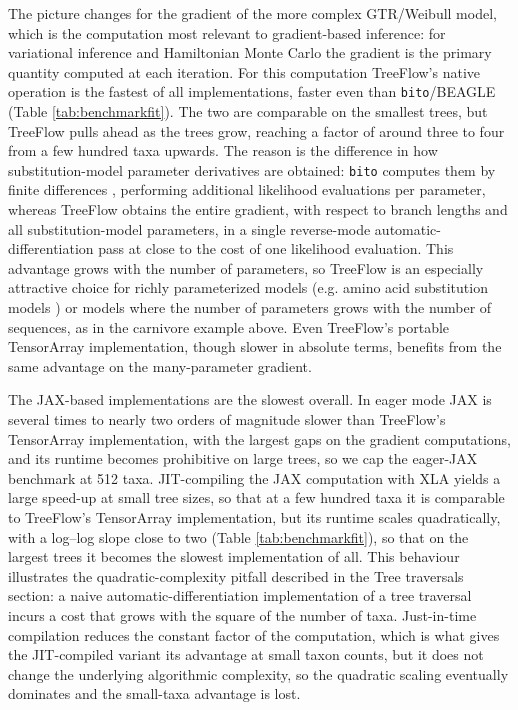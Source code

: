 The picture changes for the gradient of the more complex GTR/Weibull model, which is the computation most relevant to gradient-based inference: for variational inference and Hamiltonian Monte Carlo the gradient is the primary quantity computed at each iteration. For this computation TreeFlow's native operation is the fastest of all implementations, faster even than \texttt{bito}/BEAGLE (Table \ref{tab:benchmarkfit}). The two are comparable on the smallest trees, but TreeFlow pulls ahead as the trees grow, reaching a factor of around three to four from a few hundred taxa upwards. The reason is the difference in how substitution-model parameter derivatives are obtained: \texttt{bito} computes them by finite differences \cite{fourment2023automatic}, performing additional likelihood evaluations per parameter, whereas TreeFlow obtains the entire gradient, with respect to branch lengths and all substitution-model parameters, in a single reverse-mode automatic-differentiation pass at close to the cost of one likelihood evaluation. This advantage grows with the number of parameters, so TreeFlow is an especially attractive choice for richly parameterized models (e.g. amino acid substitution models \cite{adachi1996model}) or models where the number of parameters grows with the number of sequences, as in the carnivore example above. Even TreeFlow's portable TensorArray implementation, though slower in absolute terms, benefits from the same advantage on the many-parameter gradient.

The JAX-based implementations are the slowest overall. In eager mode JAX is several times to nearly two orders of magnitude slower than TreeFlow's TensorArray implementation, with the largest gaps on the gradient computations, and its runtime becomes prohibitive on large trees, so we cap the eager-JAX benchmark at 512 taxa. JIT-compiling the JAX computation with XLA yields a large speed-up at small tree sizes, so that at a few hundred taxa it is comparable to TreeFlow's TensorArray implementation, but its runtime scales quadratically, with a log--log slope close to two (Table \ref{tab:benchmarkfit}), so that on the largest trees it becomes the slowest implementation of all. This behaviour illustrates the quadratic-complexity pitfall described in the Tree traversals section: a naive automatic-differentiation implementation of a tree traversal incurs a cost that grows with the square of the number of taxa. Just-in-time compilation reduces the constant factor of the computation, which is what gives the JIT-compiled variant its advantage at small taxon counts, but it does not change the underlying algorithmic complexity, so the quadratic scaling eventually dominates and the small-taxa advantage is lost.

